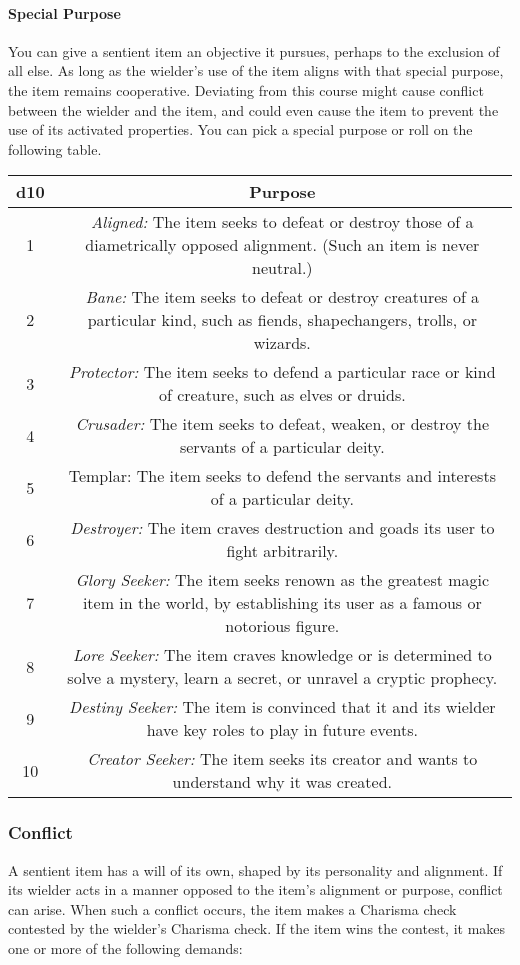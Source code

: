 \documentclass[
]{article}
\begin{document}
\hypertarget{special-purpose}{%
\paragraph{Special Purpose}\label{special-purpose}}

You can give a sentient item an objective it pursues, perhaps to the
exclusion of all else. As long as the wielder's use of the item aligns
with that special purpose, the item remains cooperative. Deviating from
this course might cause conflict between the wielder and the item, and
could even cause the item to prevent the use of its activated
properties. You can pick a special purpose or roll on the following
table.

\begin{longtable}[]{@{}cc@{}}
\toprule
d10 & Purpose\tabularnewline
\midrule
\endhead
1 & \emph{Aligned:} The item seeks to defeat or destroy those of a
diametrically opposed alignment. (Such an item is never
neutral.)\tabularnewline
2 & \emph{Bane:} The item seeks to defeat or destroy creatures of a
particular kind, such as fiends, shapechangers, trolls, or
wizards.\tabularnewline
3 & \emph{Protector:} The item seeks to defend a particular race or kind
of creature, such as elves or druids.\tabularnewline
4 & \emph{Crusader:} The item seeks to defeat, weaken, or destroy the
servants of a particular deity.\tabularnewline
5 & Templar: The item seeks to defend the servants and interests of a
particular deity.\tabularnewline
6 & \emph{Destroyer:} The item craves destruction and goads its user to
fight arbitrarily.\tabularnewline
7 & \emph{Glory Seeker:} The item seeks renown as the greatest magic
item in the world, by establishing its user as a famous or notorious
figure.\tabularnewline
8 & \emph{Lore Seeker:} The item craves knowledge or is determined to
solve a mystery, learn a secret, or unravel a cryptic
prophecy.\tabularnewline
9 & \emph{Destiny Seeker:} The item is convinced that it and its wielder
have key roles to play in future events.\tabularnewline
10 & \emph{Creator Seeker:} The item seeks its creator and wants to
understand why it was created.\tabularnewline
\bottomrule
\end{longtable}

\hypertarget{conflict}{%
\subsubsection{Conflict}\label{conflict}}

A sentient item has a will of its own, shaped by its personality and
alignment. If its wielder acts in a manner opposed to the item's
alignment or purpose, conflict can arise. When such a conflict occurs,
the item makes a Charisma check contested by the wielder's Charisma
check. If the item wins the contest, it makes one or more of the
following demands:
\end{document}
